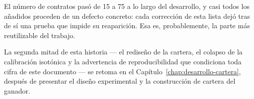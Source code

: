 \begin{table}[H]
  \centering
  \footnotesize
  \caption{Versiones del catálogo cerrado y crecimiento de la batería de pruebas.}
  \label{tab:versiones}
  
  \caption*{Fuente:  y .}
\end{table}

El número de contratos pasó de 15 a 75 a lo largo del desarrollo, y casi todos los añadidos
proceden de un defecto concreto: cada corrección de esta lista dejó tras de sí una prueba que
impide su reaparición. Esa es, probablemente, la parte más reutilizable del trabajo.

La segunda mitad de esta historia --- el rediseño de la cartera, el colapso de la calibración
isotónica y la advertencia de reproducibilidad que condiciona toda cifra de este documento --- se
retoma en el Capítulo~\ref{chap:desarrollo-cartera}, después de presentar el diseño experimental y
la construcción de cartera del ganador.
